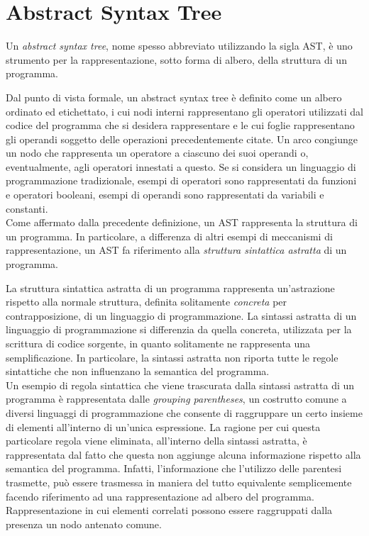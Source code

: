 \section{Abstract Syntax Tree}
\label{abstract-syntax-tree}

Un \textit{abstract syntax tree}, nome spesso abbreviato utilizzando la sigla
AST, è uno strumento per la rappresentazione, sotto forma di albero, della
struttura di un programma.

Dal punto di vista formale, un abstract syntax tree è definito come un albero
ordinato ed etichettato, i cui nodi interni rappresentano gli operatori
utilizzati dal codice del programma che si desidera rappresentare e le cui
foglie rappresentano gli operandi soggetto delle operazioni precedentemente
citate. Un arco congiunge un nodo che rappresenta un operatore a ciascuno dei
suoi operandi o, eventualmente, agli operatori innestati a questo. Se si
considera un linguaggio di programmazione tradizionale, esempi di operatori sono
rappresentati da funzioni e operatori booleani, esempi di operandi sono
rappresentati da variabili e constanti.\\

Come affermato dalla precedente definizione, un AST rappresenta la struttura di
un programma. In particolare, a differenza di altri esempi di meccanismi di
rappresentazione, un AST fa riferimento alla \textit{struttura sintattica
astratta} di un programma.

La struttura sintattica astratta di un programma rappresenta un’astrazione
rispetto alla normale struttura, definita solitamente \textit{concreta} per
contrapposizione, di un linguaggio di programmazione. La sintassi astratta di un
linguaggio di programmazione si differenzia da quella concreta, utilizzata per
la scrittura di codice sorgente, in quanto solitamente ne rappresenta una
semplificazione. In particolare, la sintassi astratta non riporta tutte le
regole sintattiche che non influenzano la semantica del programma.\\

Un esempio di regola sintattica che viene trascurata dalla sintassi astratta di
un programma è rappresentata dalle \textit{grouping parentheses}, un costrutto
comune a diversi linguaggi di programmazione che consente di raggruppare un
certo insieme di elementi all'interno di un'unica espressione. La ragione per
cui questa particolare regola viene eliminata, all’interno della sintassi
astratta, è rappresentata dal fatto che questa non aggiunge alcuna informazione
rispetto alla semantica del programma. Infatti, l’informazione che l’utilizzo
delle parentesi trasmette, può essere trasmessa in maniera del tutto equivalente
semplicemente facendo riferimento ad una rappresentazione ad albero del
programma. Rappresentazione in cui elementi correlati possono essere raggruppati
dalla presenza un nodo antenato comune.

